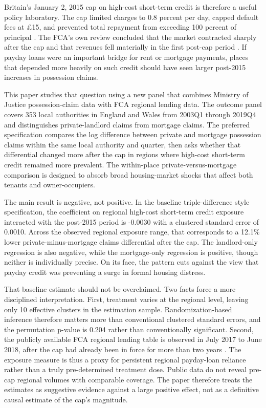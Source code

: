 \documentclass[12pt]{article}
\begin{document}
Britain's January 2, 2015 cap on high-cost short-term credit is therefore a useful policy laboratory. The cap limited charges to 0.8 percent per day, capped default fees at \pounds 15, and prevented total repayment from exceeding 100 percent of principal \citep{fca2014ps}. The FCA's own review concluded that the market contracted sharply after the cap and that revenues fell materially in the first post-cap period \citep{fca2017review}. If payday loans were an important bridge for rent or mortgage payments, places that depended more heavily on such credit should have seen larger post-2015 increases in possession claims.

This paper studies that question using a new panel that combines Ministry of Justice possession-claim data with FCA regional lending data. The outcome panel covers 353 local authorities in England and Wales from 2003Q1 through 2019Q4 and distinguishes private-landlord claims from mortgage claims. The preferred specification compares the log difference between private and mortgage possession claims within the same local authority and quarter, then asks whether that differential changed more after the cap in regions where high-cost short-term credit remained more prevalent. The within-place private-versus-mortgage comparison is designed to absorb broad housing-market shocks that affect both tenants and owner-occupiers.

The main result is negative, not positive. In the baseline triple-difference style specification, the coefficient on regional high-cost short-term credit exposure interacted with the post-2015 period is -0.0030 with a clustered standard error of 0.0010. Across the observed regional exposure range, that corresponds to a 12.1\% lower private-minus-mortgage claims differential after the cap. The landlord-only regression is also negative, while the mortgage-only regression is positive, though neither is individually precise. On its face, the pattern cuts against the view that payday credit was preventing a surge in formal housing distress.

That baseline estimate should not be overclaimed. Two facts force a more disciplined interpretation. First, treatment varies at the regional level, leaving only 10 effective clusters in the estimation sample. Randomization-based inference therefore matters more than conventional clustered standard errors, and the permutation p-value is 0.204 rather than conventionally significant. Second, the publicly available FCA regional lending table is observed in July 2017 to June 2018, after the cap had already been in force for more than two years \citep{fca2019data}. The exposure measure is thus a proxy for persistent regional payday-loan reliance rather than a truly pre-determined treatment dose. Public data do not reveal pre-cap regional volumes with comparable coverage. The paper therefore treats the estimates as suggestive evidence against a large positive effect, not as a definitive causal estimate of the cap's magnitude.
\end{document}
